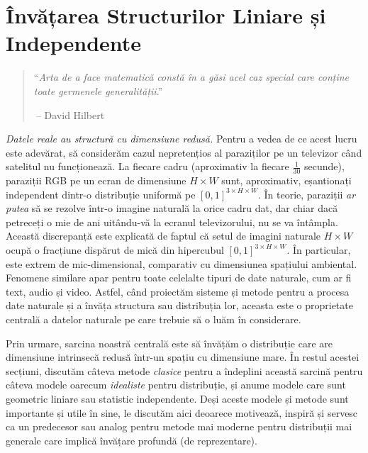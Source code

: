 \documentclass[../../book-main_ro.tex]{subfiles}
\begin{document}
\chapter{Învățarea Structurilor Liniare și Independente}
\label{ch:classic}\label{ch:linear-independent}

\begin{quote}
\hfill  ``{\em Arta de a face matematică constă în a găsi acel caz special care conține toate germenele generalității}.''


$~$\hfill -- David Hilbert
\end{quote}
\vspace{5mm}







\textit{Datele reale au structură cu dimensiune redusă.} Pentru a vedea de ce acest lucru este adevărat, să considerăm cazul nepretențios al paraziților pe un televizor când satelitul nu funcționează. La fiecare cadru (aproximativ la fiecare \(\frac{1}{30}\) secunde), paraziții RGB pe un ecran de dimensiune \(H \times W\) sunt, aproximativ, eșantionați independent dintr-o distribuție uniformă pe \([0, 1]^{3 \times H \times W}\). În teorie, paraziții \textit{ar putea} să se rezolve într-o imagine naturală la orice cadru dat, dar chiar dacă petreceți o mie de ani uitându-vă la ecranul televizorului, nu se va întâmpla. Această discrepanță este explicată de faptul că setul de imagini naturale \(H \times W\) ocupă o fracțiune dispărut de mică din hipercubul \([0, 1]^{3 \times H \times W}\). În particular, este extrem de mic-dimensional, comparativ cu dimensiunea spațiului ambiental. Fenomene similare apar pentru toate celelalte tipuri de date naturale, cum ar fi text, audio și video. Astfel, când proiectăm sisteme și metode pentru a procesa date naturale și a învăța structura sau distribuția lor, aceasta este o proprietate centrală a datelor naturale pe care trebuie să o luăm în considerare. %

Prin urmare, sarcina noastră centrală este să învățăm o distribuție care are dimensiune intrinsecă redusă într-un spațiu cu dimensiune mare. În restul acestei secțiuni, discutăm câteva metode \textit{clasice} pentru a îndeplini această sarcină pentru câteva modele oarecum {\em idealiste} pentru distribuție, și anume modele care sunt geometric liniare sau statistic independente. Deși aceste modele și metode sunt importante și utile în sine, le discutăm aici deoarece motivează, inspiră și servesc ca un predecesor sau analog pentru metode mai moderne pentru distribuții mai generale care implică învățare profundă (de reprezentare).
\end{document}
